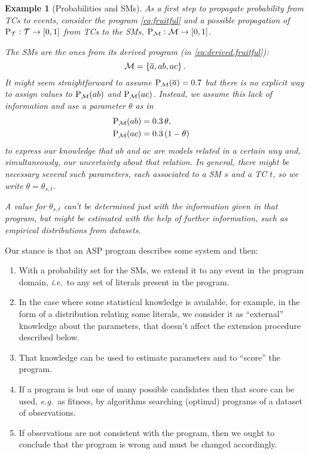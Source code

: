 \documentclass[a4paper]{article}
\newtheorem{example}{Example}
\newtheorem{example}{Example}
\newcommand{\at}[1]{\ensuremath{\!\del{#1}}}        %
\newcommand{\cla}[1]{\ensuremath{{\cal #1}}}        %
\newcommand{\co}[1]{\ensuremath{\overline{#1}}}     %
\newcommand{\TCHOICEset}{\ensuremath{\cla{T}}}
\newcommand{\MODELset}{\ensuremath{\cla{M}}}
\newcommand{\prfunc}{\ensuremath{\mathrm{P}}}
\newcommand{\prd}[1]{\ensuremath{\prfunc_{#1}}}
\newcommand{\prT}{\prd{\TCHOICEset}}
\newcommand{\prM}{\prd{\MODELset}}
\begin{document}
\begin{example}[Probabilities and \aclp{SM}]%
  \label{running.example}%
  \em As a first step to propagate probability from \aclp{TC} to
  events, consider the program \cref{eq:fruitful} and a possible
  propagation of \(\prT:\TCHOICEset \to \intcc{0,1}\) from \aclp{TC}
  to the \aclp{SM}, \(\prM:\MODELset \to \intcc{0,1}\).

  The \aclp{SM} are the ones from its derived program (in
  \cref{eq:derived.fruitful}):
       \[ \MODELset = \set{\co{a}, ab, ac}. \]
  It might seem straightforward to assume \(\prM\at{\co{a}}=0.7\) but
  \emph{there is no explicit way to assign values to \(\prM\at{ab}\) and
    \(\prM\at{ac}\)}.  Instead, we assume this lack of information and use a
  parameter \(\theta\) as in
  \begin{equation*}
    \begin{aligned}
            \prM\at{ab} & = 0.3\, \theta, \cr
            \prM\at{ac} & = 0.3\, (1 - \theta)
    \end{aligned}
  \end{equation*}
  to express our knowledge that $ab$ and $ac$ are models related in a
  certain way and, simultaneously, our uncertainty about that
  relation.  In general, there might be necessary several such
  parameters, each associated to a \acl{SM} \(s\) and a \acl{TC}
  \(t\), so we write \(\theta=\theta_{s,t}\).

  A value for \(\theta_{s,t}\) can't be determined just with the
  information given in that program, but might be estimated with the
  help of further information, such as empirical distributions from
  datasets.
\end{example}

Our stance is that an \ac{ASP} program describes some system and then:

\begin{enumerate}
\item With a probability set for the \aclp{SM}, we extend it to any
  event in\ the program domain, \textit{i.e.}\ to any set of literals
  present in the program.

\item In the case where some statistical knowledge is available, for
  example, in the form of a distribution relating some literals, we
  consider it as ``external'' knowledge about the parameters, that
  doesn't affect the extension procedure described below.

\item That knowledge can be used to estimate parameters and to
  ``score'' the program.

\item\label{item:program.selection} If a program is but one of many
  possible candidates then that score can be used, \emph{e.g.}\ as
  fitness, by algorithms searching (optimal) programs of a dataset of
  observations.

\item If observations are not consistent with the program, then we
  ought to conclude that the program is wrong and must be changed
  accordingly.
\end{enumerate}
\end{document}
